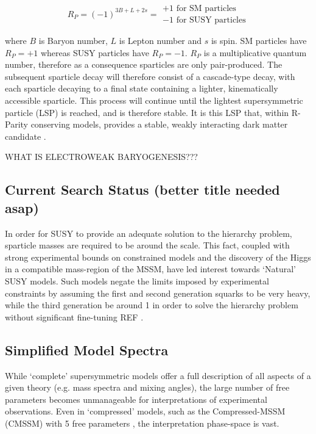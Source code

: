 \begin{equation}
R_P = (-1)^{3B+L+2s} =
\begin{array}{l} 
+1 \text{ for SM particles}\\ -1 \text{ for SUSY particles}
\end{array}
\end{equation}

where $B$ is Baryon number, $L$ is Lepton number and $s$ is spin. SM particles
have $R_P = +1$ whereas SUSY particles have $R_P = -1$. $R_P$ is a
multiplicative quantum number, therefore as a consequence sparticles
are only pair-produced. The subsequent sparticle decay will therefore consist
of a cascade-type decay, with each sparticle decaying to a final state
containing a lighter, kinematically accessible sparticle. This process will
continue until the lightest supersymmetric particle (LSP) is reached, and is
therefore stable. It is this LSP that, within R-Parity conserving models,
provides a stable, weakly interacting dark matter candidate
\cite{Jungman:1995df}.

WHAT IS ELECTROWEAK BARYOGENESIS???

\subsection{Current Search Status (better title needed asap)}
In order for SUSY to provide an adequate solution to the hierarchy problem,
sparticle masses are required to be around the \tev scale. This fact, coupled
with strong experimental bounds on constrained models and the discovery of
the Higgs in a compatible mass-region of the MSSM, have led interest
towards `Natural' SUSY models. Such models negate the limits imposed by
experimental constraints by assuming the first and second generation squarks to
be very heavy, while the third generation be around 1 \tev in order to solve
the hierarchy problem without significant fine-tuning REF \cite{Carena:2008rt}.

\subsection{Simplified Model Spectra}
While `complete' supersymmetric models offer a full description of all
aspects of a given theory (e.g. mass spectra and mixing angles), the large
number of free parameters becomes unmanageable for interpretations
of experimental observations. Even in `compressed' models, such as the
Compressed-MSSM (CMSSM) with 5
free parameters \cite{Kane:1993td}, the interpretation phase-space is vast.

